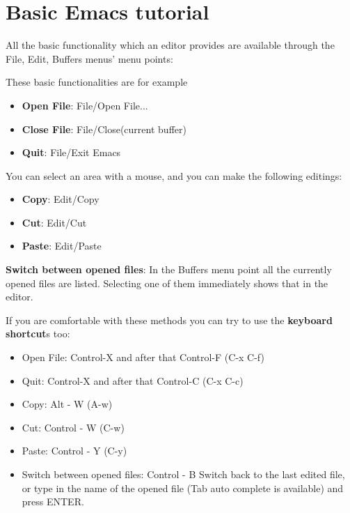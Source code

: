 \documentclass[12pt]{article}
\begin{document}
\section{Basic Emacs tutorial}
\label{emacs}

All the basic functionality which an editor provides are available through
the File, Edit, Buffers menus' menu points:

These basic functionalities are for example
\begin{itemize}
	\item {\bf Open File}: File/Open File...
	\item {\bf Close File}: File/Close(current buffer)
	\item {\bf Quit}: File/Exit Emacs
\end{itemize}


You can select an area with a mouse, and you can make the following editings:
\begin{itemize}
	\item {\bf Copy}: Edit/Copy
	\item {\bf Cut}: Edit/Cut
	\item {\bf Paste}: Edit/Paste
\end{itemize}

{\bf Switch between opened files}: In the Buffers menu point all the currently 
 opened files are listed. Selecting one of them immediately shows that in the 
 editor.

If you are comfortable with these methods you can try to use the {\bf keyboard 
shortcut}s too:
\begin{itemize}
	\item Open File: Control-X and after that Control-F (C-x C-f)
	\item Quit: Control-X and after that Control-C (C-x C-c)

	\item Copy: Alt - W (A-w)
	\item Cut: Control - W (C-w)
	\item Paste: Control - Y (C-y)

	\item Switch between opened files:
	Control - B Switch back to the last edited file, or type in the name of the 
	 opened file (Tab auto complete is available) and press ENTER.

\end{itemize}
\end{document}
